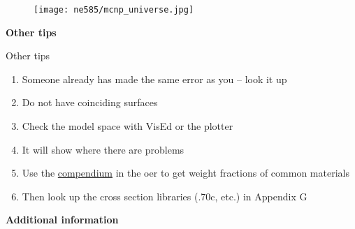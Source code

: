 \documentclass[aspectratio=1610,pdftex,dvipsnames,compress,xcolor={dvipsnames}]{beamer}
\newcommand{\acs}{\acrshort} %
\begin{document}
\begin{frame}{}
    \begin{figure}
        \centering
        \texttt{[image: ne585/mcnp\_universe.jpg]}
    \end{figure}
\end{frame}


\begin{frame}[plain]{}
    \centering\LARGE\textbf{Other tips}
\end{frame}


\addtocounter{framenumber}{-1} 
\begin{frame}{Other tips}
    \begin{enumerate}[series=outerlist,topsep=0pt,itemsep=21pt,leftmargin=*,label=(\arabic*)]
        \item[]Someone already has made the same error as you -- look it up
        \item[]Do not have coinciding surfaces
        \item[]Check the model space with VisEd or the plotter
        \item[]It will show where there are problems
        \item[]Use the \href{https://uidaho.pressbooks.pub/nuclearengineering/chapter/mcnp/}{compendium} in the \acs{oer} to get weight fractions of common materials
        \item[]Then look up the cross section libraries (.70c, etc.) in Appendix G
    \end{enumerate}
\end{frame}


\begin{frame}[plain]{}
    \centering\LARGE\textbf{Additional information}
\end{frame}
\end{document}
